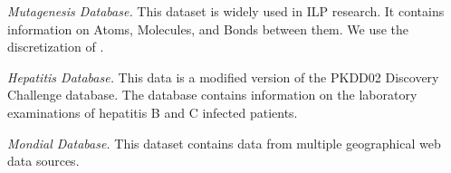 \documentclass{article}
\begin{document}
{\em Mutagenesis Database.} This dataset is widely used in ILP research.
It contains information on Atoms, Molecules, and Bonds between them. We use the discretization of \cite{Schulte2012}.
%

{\em Hepatitis Database.} This data is a modified version of the PKDD02 Discovery Challenge database.
The database contains information on the laboratory examinations of hepatitis B and C infected patients. 


{\em Mondial Database.} 
%
%
This dataset contains data from multiple geographical web data sources. %
\end{document}
